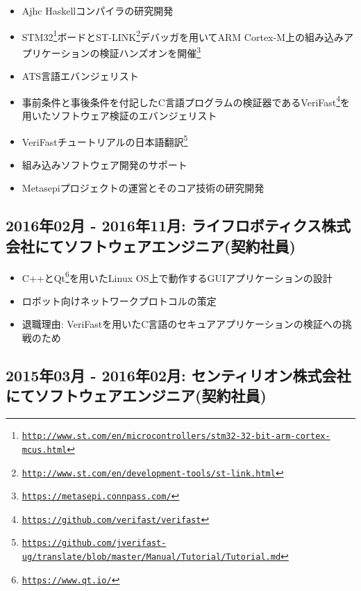 \documentclass[letterpaper]{article}
\begin{document}
\begin{itemize}
  \item Ajhc Haskellコンパイラの研究開発
  \item STM32\footnote{\href{http://www.st.com/en/microcontrollers/stm32-32-bit-arm-cortex-mcus.html}{\tt http://www.st.com/en/microcontrollers/stm32-32-bit-arm-cortex-mcus.html}}ボードとST-LINK\footnote{\href{http://www.st.com/en/development-tools/st-link.html}{\tt http://www.st.com/en/development-tools/st-link.html}}デバッガを用いてARM Cortex-M上の組み込みアプリケーションの検証ハンズオンを開催\footnote{\href{https://metasepi.connpass.com/}{\tt https://metasepi.connpass.com/}}
  \item ATS言語エバンジェリスト
  \item 事前条件と事後条件を付記したC言語プログラムの検証器であるVeriFast\footnote{\href{https://github.com/verifast/verifast}{\tt https://github.com/verifast/verifast}}を用いたソフトウェア検証のエバンジェリスト
  \item VeriFastチュートリアルの日本語翻訳\footnote{\href{https://github.com/jverifast-ug/translate/blob/master/Manual/Tutorial/Tutorial.md}{\tt https://github.com/jverifast-ug/translate/blob/master/Manual/Tutorial/Tutorial.md}}
  \item 組み込みソフトウェア開発のサポート
  \item Metasepiプロジェクトの運営とそのコア技術の研究開発
\end{itemize}

\subsection*{2016年02月 - 2016年11月: ライフロボティクス株式会社にてソフトウェアエンジニア(契約社員)}

\begin{itemize}
  \item C++とQt\footnote{\href{https://www.qt.io/}{\tt https://www.qt.io/}}を用いたLinux OS上で動作するGUIアプリケーションの設計
  \item ロボット向けネットワークプロトコルの策定
  \item 退職理由: VeriFastを用いたC言語のセキュアアプリケーションの検証への挑戦のため
\end{itemize}

\subsection*{2015年03月 - 2016年02月: センティリオン株式会社にてソフトウェアエンジニア(契約社員)}
\end{document}
